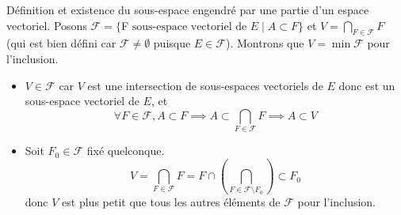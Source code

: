 \documentclass{article}
\renewenvironment{question_kholle}[2][ ]
{
	\subsection{\texorpdfstring{#2}{}}
	\notblank{#1}
	{
		\noindent #1
		\bigbreak
	}
	{}
	\begin{proof}
}
{
	\end{proof}
}
\begin{document}
\begin{question_kholle}{Définition et existence du sous-espace engendré par une partie d’un espace vectoriel.}
	Posons $\mathcal{F}=\{$F$ \text{ sous-espace vectoriel de } E \mid A\subset F\}$ et $\displaystyle V=\bigcap_{F\in \mathcal{F}}F$ (qui est bien défini car $\mathcal{F}\neq \emptyset$ puisque $E\in\mathcal F$). Montrons que $V=\min \mathcal{F}$ pour l’inclusion.
	\begin{itemize}
		\item $V\in \mathcal{F}$ car $V$ est une intersection de sous-espaces vectoriels de $E$ donc est un sous-espace vectoriel de $E$, et
		      \[
			      \forall F\in \mathcal{F}, A\subset F \implies  A\subset \bigcap_{F\in \mathcal{F}}F \implies A\subset V
		      \]
		\item Soit $F_{0}\in \mathcal{F}$ fixé quelconque.
		      \[
			      V=\bigcap_{F\in \mathcal{F}} F = F \cap \left(\bigcap_{F\in \mathcal{F}\setminus F_{0}}\right)\subset F_{0}
		      \]
		      donc $V$ est plus petit que tous les autres éléments de $\mathcal{F}$ pour l’inclusion.
	\end{itemize}
\end{question_kholle}
\end{document}
